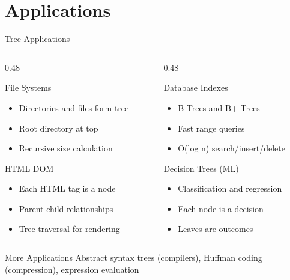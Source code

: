 \documentclass[aspectratio=169,xcolor=dvipsnames]{beamer}
\begin{document}
\section{Applications}

\begin{frame}{Tree Applications}
  \begin{columns}
    \begin{column}{0.48\textwidth}
      \begin{block}{File Systems}
        \begin{itemize}
          \item Directories and files form tree
          \item Root directory at top
          \item Recursive size calculation
        \end{itemize}
      \end{block}

      \begin{block}{HTML DOM}
        \begin{itemize}
          \item Each HTML tag is a node
          \item Parent-child relationships
          \item Tree traversal for rendering
        \end{itemize}
      \end{block}
    \end{column}
    \begin{column}{0.48\textwidth}
      \begin{block}{Database Indexes}
        \begin{itemize}
          \item B-Trees and B+ Trees
          \item Fast range queries
          \item O(log n) search/insert/delete
        \end{itemize}
      \end{block}

      \begin{block}{Decision Trees (ML)}
        \begin{itemize}
          \item Classification and regression
          \item Each node is a decision
          \item Leaves are outcomes
        \end{itemize}
      \end{block}
    \end{column}
  \end{columns}

  \vspace{0.3cm}

  \begin{exampleblock}{More Applications}
    Abstract syntax trees (compilers), Huffman coding (compression), expression evaluation
  \end{exampleblock}
\end{frame}
\end{document}

